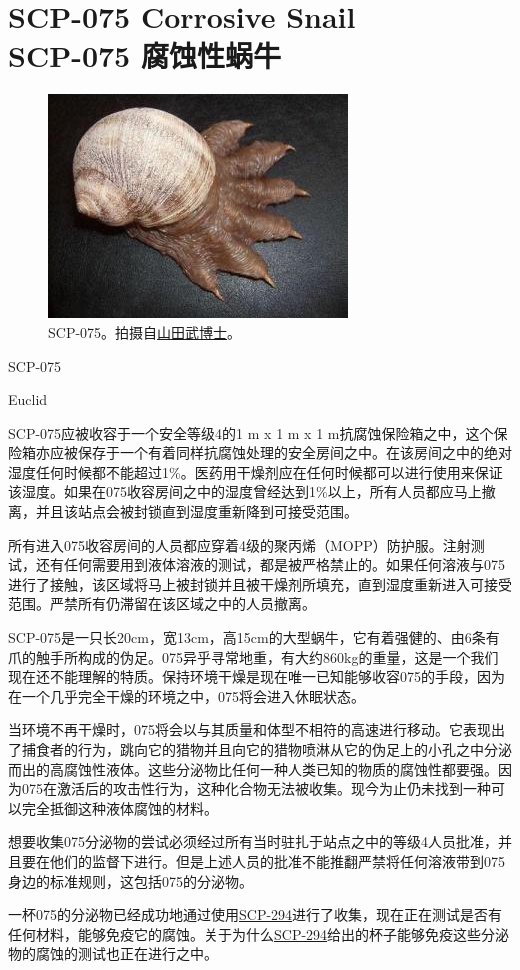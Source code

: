 \chapter[SCP-075 腐蚀性蜗牛]{
    SCP-075 Corrosive Snail\\
    SCP-075 腐蚀性蜗牛
}

\label{chap:SCP-075}

\begin{figure}[H]
    \centering
    \includegraphics[width=0.5\linewidth]{images/SCP-075.jpg}
    \caption*{SCP-075。拍摄自\hyperref[chap:]{山田武博士}。}
\end{figure}

SCP-075

Euclid

SCP-075应被收容于一个安全等级4的1 m x 1 m x 1 m抗腐蚀保险箱之中，这个保险箱亦应被保存于一个有着同样抗腐蚀处理的安全房间之中。在该房间之中的绝对湿度任何时候都不能超过1\%。医药用干燥剂应在任何时候都可以进行使用来保证该湿度。如果在075收容房间之中的湿度曾经达到1\%以上，所有人员都应马上撤离，并且该站点会被封锁直到湿度重新降到可接受范围。

所有进入075收容房间的人员都应穿着4级的聚丙烯（MOPP）防护服。注射测试，还有任何需要用到液体溶液的测试，都是被严格禁止的。如果任何溶液与075进行了接触，该区域将马上被封锁并且被干燥剂所填充，直到湿度重新进入可接受范围。严禁所有仍滞留在该区域之中的人员撤离。

SCP-075是一只长20cm，宽13cm，高15cm的大型蜗牛，它有着强健的、由6条有爪的触手所构成的伪足。075异乎寻常地重，有大约860kg的重量，这是一个我们现在还不能理解的特质。保持环境干燥是现在唯一已知能够收容075的手段，因为在一个几乎完全干燥的环境之中，075将会进入休眠状态。

当环境不再干燥时，075将会以与其质量和体型不相符的高速进行移动。它表现出了捕食者的行为，跳向它的猎物并且向它的猎物喷淋从它的伪足上的小孔之中分泌而出的高腐蚀性液体。这些分泌物比任何一种人类已知的物质的腐蚀性都要强。因为075在激活后的攻击性行为，这种化合物无法被收集。现今为止仍未找到一种可以完全抵御这种液体腐蚀的材料。

想要收集075分泌物的尝试必须经过所有当时驻扎于站点之中的等级4人员批准，并且要在他们的监督下进行。但是上述人员的批准不能推翻严禁将任何溶液带到075身边的标准规则，这包括075的分泌物。

一杯075的分泌物已经成功地通过使用\hyperref[chap:SCP-294]{SCP-294}进行了收集，现在正在测试是否有任何材料，能够免疫它的腐蚀。关于为什么\hyperref[chap:SCP-294]{SCP-294}给出的杯子能够免疫这些分泌物的腐蚀的测试也正在进行之中。
